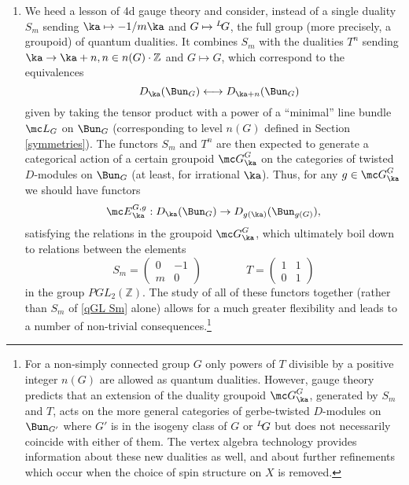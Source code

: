 \documentclass[11pt,reqno]{amsart}
\theoremstyle{plain}
\numberwithin{equation}{section}
\newcommand{\Z}{\mathbb{Z}}
\def\neg{\negthinspace}
\def\LG{{}^L\neg G}
\theoremstyle{definition}
\begin{document}
\begin{enumerate}

\item We heed a lesson of 4d gauge theory and consider, instead of a
  single duality $S_m$ sending $\ka \mapsto -1/m\ka$ and $G \mapsto
  \LG$, the full group (more precisely, a groupoid) of quantum
  dualities. It combines $S_m$ with the dualities $T^n$ sending $\ka
  \to \ka+n, n \in n(G) \cdot \Z$ and $G \mapsto G$, which correspond
  to the equivalences
\begin{equation}    \label{qGL T}
\quad D_\ka(\Bun_G)  \longleftrightarrow  D_{\ka+n}(\Bun_G)  
\end{equation}
given by taking the tensor product with a power of a ``minimal'' line
bundle ${\mc L}_G$ on $\Bun_G$ (corresponding to level $n(G)$ defined
in Section \ref{symmetries}). The functors $S_m$ and $T^n$ are then
expected to generate a categorical action of a certain groupoid ${\mc
  G}^G_\ka$ on the categories of twisted $D$-modules on $\Bun_G$ (at
least, for irrational $\ka$). Thus, for any $g \in {\mc G}^G_\ka$ we
should have functors
\begin{equation}    \label{gen qGL}
{\mc E}^{G,g}_\ka: D_\ka(\Bun_G) \to D_{g(\ka)}(\Bun_{g(G)}),
\end{equation}
satisfying the relations in the groupoid ${\mc G}^G_\ka$, which
ultimately boil down to relations between the elements
\begin{equation}
S_m = \begin{pmatrix}
0 & -1 \\
m & 0
\end{pmatrix} \qquad \qquad T = \begin{pmatrix}
1 & 1 \\
0 & 1
\end{pmatrix}  
\end{equation}
in the group $PGL_2(\Z)$. The study of all of these functors together
(rather than $S_m$ of \eqref{qGL Sm} alone) allows for a much greater
flexibility and leads to a number of non-trivial
consequences.\footnote{For a non-simply connected group $G$ only
  powers of $T$ divisible by a positive integer $n(G)$ are allowed as
  quantum dualities. However, gauge theory predicts that an extension
  of the duality groupoid ${\mc G}^G_\ka$, generated by $S_m$ and $T$,
  acts on the more general categories of gerbe-twisted $D$-modules on
  $\Bun_{G'}$ where $G'$ is in the isogeny class of $G$ or $\LG$ but
  does not necessarily coincide with either of them. The vertex
  algebra technology provides information about these new dualities as
  well, and about further refinements which occur when the choice of
  spin structure on $X$ is removed.}


\end{enumerate}
\end{document}

